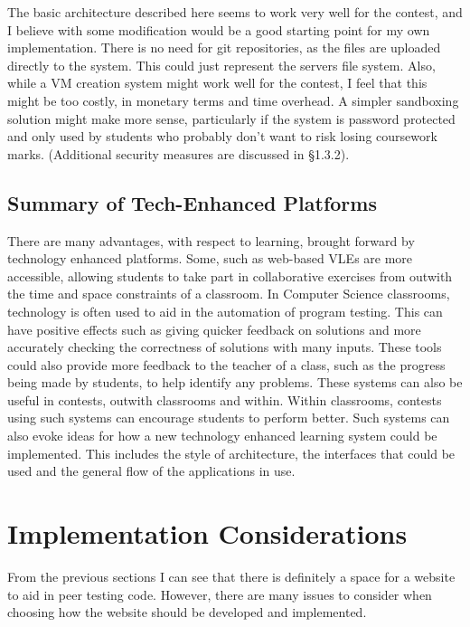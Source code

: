 \documentclass[a4paper,11pt]{report}
\begin{document}
The basic architecture described here seems to work very well for the contest, and I believe with some modification would be a good starting point for my own implementation. There is no need for git repositories, as the files are uploaded directly to the system. This could just represent the servers file system. Also, while a VM creation system might work well for the contest, I feel that this might be too costly, in monetary terms and time overhead. A simpler sandboxing solution might make more sense, particularly if the system is password protected and only used by students who probably don't want to risk losing coursework marks. (Additional security measures are discussed in \S 1.3.2).

\subsection{Summary of Tech-Enhanced Platforms}
There are many advantages, with respect to learning, brought forward by technology enhanced platforms. Some, such as web-based VLEs are more accessible, allowing students to take part in collaborative exercises from outwith the time and space constraints of a classroom. In Computer Science classrooms, technology is often used to aid in the automation of program testing. This can have positive effects such as giving quicker feedback on solutions and more accurately checking the correctness of solutions with many inputs. These tools could also provide more feedback to the teacher of a class, such as the progress being made by students, to help identify any problems. These systems can also be useful in contests, outwith classrooms and within. Within classrooms, contests using such systems can encourage students to perform better. Such systems can also evoke ideas for how a new technology enhanced learning system could be implemented. This includes the style of architecture, the interfaces that could be used and the general flow of the applications in use.\par




\section{Implementation Considerations}
From the previous sections I can see that there is definitely a space for a website to aid in peer testing code. However, there are many issues to consider when choosing how the website should be developed and implemented.
\end{document}
